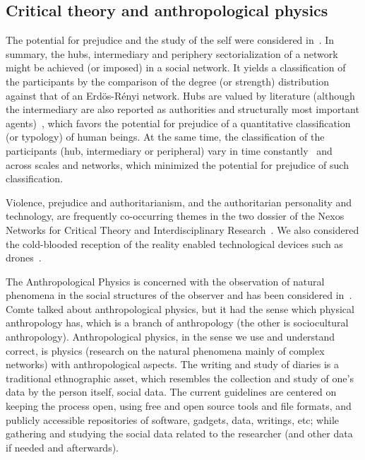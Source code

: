 \documentclass[letterpaper,10pt]{article}
\begin{document}
\subsection{Critical theory and anthropological physics}\label{exp}
The potential for prejudice and the study of the self
were considered in~\cite{imp,stab,tese}.
In summary, the hubs, intermediary and periphery sectorialization
of a network might be achieved (or imposed) in a social network.
It yields a classification of the participants
by the comparison of the degree (or strength) distribution
against that of an Erdös-Rényi network.
Hubs are valued by literature
(although the intermediary are also reported as authorities
and structurally most important agents)~\cite{ega},
which favors the potential for prejudice
of a quantitative classification (or typology)
of human beings.
At the same time, the classification of the participants
(hub, intermediary or peripheral)
vary in time constantly~\cite{stab,tese}
and across scales and networks,
which minimized the potential
for prejudice of such classification.

Violence, prejudice and authoritarianism,
and the authoritarian personality and technology,
are frequently co-occurring themes in the two dossier of the
Nexos Networks for Critical Theory and Interdisciplinary Research~\cite{nexos1}.
We also considered the cold-blooded reception of the reality
enabled technological devices such as drones~\cite{drones}.

The Anthropological Physics is concerned
with the observation of natural
phenomena in the social structures
of the observer and has been
considered in~\cite{an,an2,tese}.
Comte talked about anthropological physics,
but it had the sense which physical
anthropology has, which is a branch of anthropology
(the other is sociocultural anthropology).
Anthropological physics, in the sense we use and understand correct,
is physics (research on the natural phenomena mainly of complex networks)
with anthropological aspects.
The writing and study of diaries is a traditional ethnographic asset,
which resembles the collection and study of one's data by the person itself,
social data.
The current guidelines are centered on keeping the process open,
using free and open source tools and file formats,
and publicly accessible repositories of software, gadgets, data, writings, etc;
while gathering and studying the social data related to the researcher
(and other data if needed and afterwards).~\cite{an,an2,imp,tese}
\end{document}
